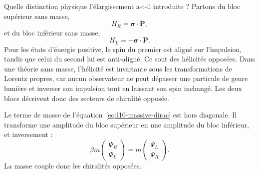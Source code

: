 Quelle distinction physique l’élargissement a-t-il introduite ? Partons du bloc supérieur sans masse,
\begin{equation}
H_R=\boldsymbol{\sigma}\cdot\mathbf P,
\end{equation}
et du bloc inférieur sans masse,
\begin{equation}
H_L=-\boldsymbol{\sigma}\cdot\mathbf P.
\end{equation}
Pour les états d’énergie positive, le spin du premier est aligné sur l’impulsion, tandis que celui du second lui est anti-aligné. Ce sont des hélicités opposées. Dans une théorie sans masse, l’hélicité est invariante sous les transformations de Lorentz propres, car aucun observateur ne peut dépasser une particule de genre lumière et inverser son impulsion tout en laissant son spin inchangé. Les deux blocs décrivent donc des secteurs de chiralité opposée.

\begin{classroomqa}
\end{classroomqa}

Le terme de masse de l’équation~\eqref{eq:l10-massive-dirac} est hors diagonale. Il transforme une amplitude du bloc supérieur en une amplitude du bloc inférieur, et inversement :
\begin{equation}
\beta m
\begin{pmatrix}
\Psi_R\\
\Psi_L
\end{pmatrix}
=
m
\begin{pmatrix}
\Psi_L\\
\Psi_R
\end{pmatrix}.
\end{equation}
La masse couple donc les chiralités opposées.

\begin{classroomqa}
\end{classroomqa}

